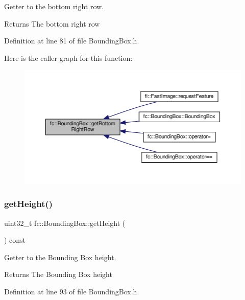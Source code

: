 Getter to the bottom right row. 

\begin{DoxyReturn}{Returns}
The bottom right row 
\end{DoxyReturn}


Definition at line 81 of file Bounding\+Box.\+h.

Here is the caller graph for this function\+:
\nopagebreak
\begin{figure}[H]
\begin{center}
\leavevmode
\includegraphics[width=350pt]{db/dc1/classfc_1_1BoundingBox_a74411180845c0572329c693170621245_icgraph}
\end{center}
\end{figure}
\mbox{\label{classfc_1_1BoundingBox_a9f26359f081940896dcf90ab5d5f0132}} 
\subsubsection{\texorpdfstring{get\+Height()}{getHeight()}}
{\footnotesize\ttfamily uint32\+\_\+t fc\+::\+Bounding\+Box\+::get\+Height (\begin{DoxyParamCaption}{ }\end{DoxyParamCaption}) const\hspace{0.3cm}{\ttfamily [inline]}}



Getter to the Bounding Box height. 

\begin{DoxyReturn}{Returns}
The Bounding Box height 
\end{DoxyReturn}


Definition at line 93 of file Bounding\+Box.\+h.

